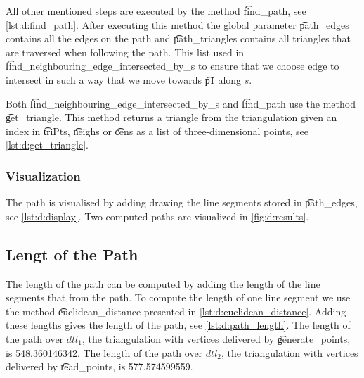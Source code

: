 		All other mentioned steps are executed by the method \t{find_path}, see \autoref{lst:d:find_path}. After executing this method the global parameter \t{path_edges} contains all the edges on the path and \t{path_triangles} contains all triangles that are traversed when following the path. This list used in \t{find_neighbouring_edge_intersected_by_s} to ensure that we choose edge to intersect in such a way that we move towards \t{p1} along $s$. 

		Both \t{find_neighbouring_edge_intersected_by_s} and \t{find_path} use the method \t{get_triangle}. This method returns a triangle from the triangulation given an index in \t{triPts}, \t{neighs} or \t{cens} as a list of three-dimensional points, see \autoref{lst:d:get_triangle}.\\

		

		

		

	\subsubsection*{Visualization}
		The path is visualised by adding drawing the line segments stored in \t{path_edges}, see \autoref{lst:d:display}. Two computed paths are visualized in \autoref{fig:d:results}.\\

		

	\subsection*{Lengt of the Path}
		The length of the path can be computed by adding the length of the line segments that from the path. To compute the length of one line segment we use the method \t{euclidean_distance} presented in \autoref{lst:d:euclidean_distance}. Adding these lengths gives the length of the path, see \autoref{lst:d:path_length}. The length of the path over $dtl_1$, the triangulation with vertices delivered by \t{generate_points}, is \num{548.360146342}. The length of the path over $dtl_2$, the triangulation with vertices delivered by \t{read_points}, is \num{577.574599559}.\\

